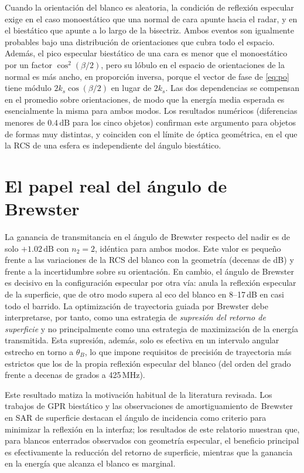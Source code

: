 \documentclass[11pt,a4paper]{report}
\newcommand{\dB}{\,\mathrm{dB}}
\begin{document}
Cuando la orientación del blanco es aleatoria, la condición de reflexión
especular exige en el caso monoestático que una normal de cara apunte hacia
el radar, y en el biestático que apunte a lo largo de la bisectriz. Ambos
eventos son igualmente probables bajo una distribución de orientaciones que
cubra todo el espacio. Además, el pico especular biestático de una cara es
menor que el monoestático por un factor $\cos^2(\beta/2)$, pero su lóbulo en
el espacio de orientaciones de la normal es más ancho, en proporción
inversa, porque el vector de fase de \eqref{eq:po} tiene módulo
$2k_s\cos(\beta/2)$ en lugar de $2k_s$. Las dos dependencias se compensan en
el promedio sobre orientaciones, de modo que la energía media esperada es
esencialmente la misma para ambos modos. Los resultados numéricos
(diferencias menores de $0.4\dB$ para los cinco objetos) confirman este
argumento para objetos de formas muy distintas, y coinciden con el límite de
óptica geométrica, en el que la RCS de una esfera es independiente del
ángulo biestático.

\section{El papel real del ángulo de Brewster}

La ganancia de transmitancia en el ángulo de Brewster respecto del nadir es
de solo $+1.02\dB$ con $n_2=2$, idéntica para ambos modos. Este valor es
pequeño frente a las variaciones de la RCS del blanco con la geometría
(decenas de dB) y frente a la incertidumbre sobre su orientación. En
cambio, el ángulo de Brewster es decisivo en la configuración especular por
otra vía: anula la reflexión especular de la superficie, que de otro modo
supera al eco del blanco en 8--17\,dB en casi todo el barrido. La
optimización de trayectoria guiada por Brewster debe interpretarse, por
tanto, como una estrategia de \emph{supresión del retorno de superficie} y
no principalmente como una estrategia de maximización de la energía
transmitida. Esta supresión, además, solo es efectiva en un intervalo
angular estrecho en torno a $\theta_B$, lo que impone requisitos de
precisión de trayectoria más estrictos que los de la propia reflexión
especular del blanco (del orden del grado frente a decenas de grados a
425\,MHz).

Este resultado matiza la motivación habitual de la literatura revisada. Los
trabajos de GPR biestático \cite{orfeo2019} y las observaciones de
amortiguamiento de Brewster en SAR de superficie \cite{ouchi2017,ouchi2018,thirion2018}
destacan el ángulo de incidencia como criterio para minimizar la reflexión
en la interfaz; los resultados de este relatorio muestran que, para blancos
enterrados observados con geometría especular, el beneficio principal es
efectivamente la reducción del retorno de superficie, mientras que la
ganancia en la energía que alcanza el blanco es marginal.
\end{document}
